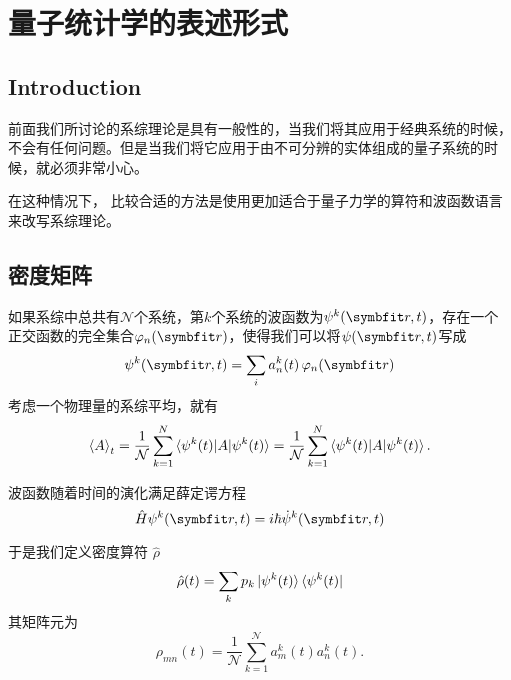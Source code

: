 \chapter{量子统计学的表述形式} 
\label{cha:量子统计学的表述形式}
\section{Introduction} %
\label{sec:quantIntroduction}
前面我们所讨论的系综理论是具有一般性的，当我们将其应用于经典系统的时候，不会有任何问题。但是当我们将它应用于由不可分辨的实体组成的量子系统的时候，就必须非常小心。

在这种情况下， 比较合适的方法是使用更加适合于量子力学的算符和波函数语言来改写系综理论。




\section{密度矩阵} %
\label{sec:密度矩阵}
如果系综中总共有$\mathcal{N}$个系统，第$k$个系统的波函数为$\psi^k(\bd{r},t)$，存在一个正交函数的完全集合$\varphi_n(\bd{r})$，使得我们可以将$\psi(\bd{r},t)$写成\begin{equation}
    \psi^k(\bd{r},t)=\sum_i a^k_n(t)\, \varphi_n(\bd{r})
\end{equation}
考虑一个物理量的系综平均，就有\begin{equation}
    \braket{A}_t=\frac{1}{\mathcal{N}}\sum_{k=1}^{N} \braket{\psi^k(t)|A|\psi^k(t)}=\frac{1}{\mathcal{N}}\sum_{k=1}^{N} \braket{\psi^k(t)|A|\psi^k(t)}.
\end{equation}

波函数随着时间的演化满足薛定谔方程\begin{equation}
    \hat{H}\psi^k(\bd{r},t)=i\hbar \dot{\psi}^k(\bd{r},t)
\end{equation}


于是我们定义密度算符 $\hat{\rho}$
\begin{equation}
    \hat{\rho}(t)=\sum_{k}p_k \ket{\psi^k(t)}\bra{\psi^k(t)}
\end{equation}
其矩阵元为\begin{equation}
    \rho_{mn}(t)=\frac{1}{\mathcal{N}} \sum_{k=1}^{\mathcal{N}} a_{m}^k(t)a_n^k (t).
\end{equation}

